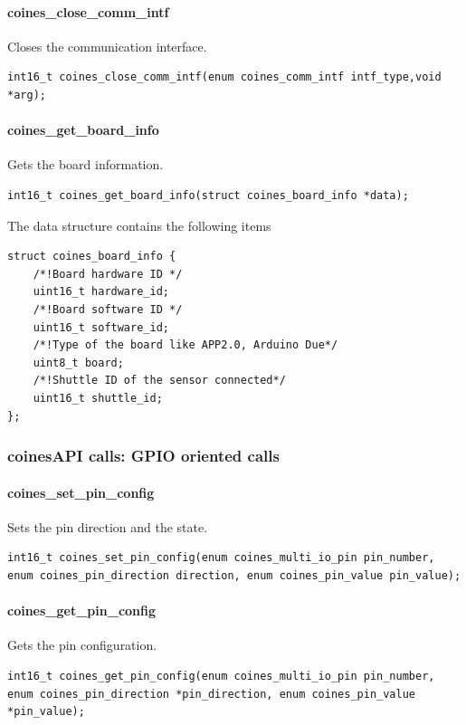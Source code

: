 \paragraph{coines\_close\_comm\_intf}
Closes the communication interface.

\begin{lstlisting}
int16_t coines_close_comm_intf(enum coines_comm_intf intf_type,void *arg); 
\end{lstlisting}

\paragraph{coines\_get\_board\_info}
Gets the board information.

\begin{lstlisting}
int16_t coines_get_board_info(struct coines_board_info *data);
\end{lstlisting}

The data structure contains the following items 

\begin{lstlisting}
struct coines_board_info {
	/*!Board hardware ID */
	uint16_t hardware_id;
	/*!Board software ID */
	uint16_t software_id;
	/*!Type of the board like APP2.0, Arduino Due*/
	uint8_t board;
	/*!Shuttle ID of the sensor connected*/
	uint16_t shuttle_id;
};
\end{lstlisting}

\subsubsection{coinesAPI calls: GPIO oriented calls}

\paragraph{coines\_set\_pin\_config}
Sets the pin direction and the state.

\begin{lstlisting}
int16_t coines_set_pin_config(enum coines_multi_io_pin pin_number, enum coines_pin_direction direction, enum coines_pin_value pin_value);  
\end{lstlisting}

\paragraph{coines\_get\_pin\_config}
Gets the pin configuration.

\begin{lstlisting}
int16_t coines_get_pin_config(enum coines_multi_io_pin pin_number, enum coines_pin_direction *pin_direction, enum coines_pin_value *pin_value);
\end{lstlisting}

